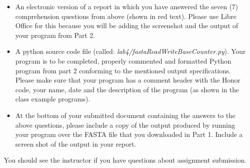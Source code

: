 \begin{itemize}
	\item An electronic version of a report in which you have answered the seven (7) comprehension questions from above (shown in red text). Please use Libre Office for this because you will be adding the screenshot and the output of your program from Part 2.
	
	\item A python source code file (called: \emph{lab4/fastaReadWriteBaseCounter.py}). Your program is to be completed, properly commented and formatted Python program from part 2 conforming to the mentioned output specifications. Please make sure that your program has a comment header with the Honor code, your name, date and the description of the program (as shown in the class example programs).
	\item At the bottom of your submitted document containing the answers to the above questions, please include a copy of the output produced by running your program over the FASTA file that you downloaded in Part 1. Include a screen shot of the output in your report.
\end{itemize}
\color{black}

\noindent You should see the instructor if you have questions about assignment submission.





\omitit{
} %



